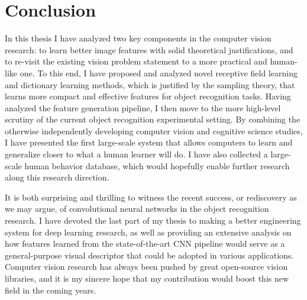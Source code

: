 \chapter{Conclusion}

In this thesis I have analyzed two key components in the computer vision research: to learn better image features with solid theoretical justifications, and to re-visit the existing vision problem statement to a more practical and human-like one. To this end, I have proposed and analyzed novel receptive field learning and dictionary learning methods, which is justified by the \nystrom sampling theory, that learns more compact and effective features for object recognition tasks. Having analyzed the feature generation pipeline, I then move to the more high-level scrutiny of the current object recognition experimental setting. By combining the otherwise independently developing computer vision and cognitive science studies, I have presented the first large-scale system that allows computers to learn and generalize closer to what a human learner will do. I have also collected a large-scale human behavior database, which would hopefully enable further research along this research direction.

It is both surprising and thrilling to witness the recent success, or rediscovery as we may argue, of convolutional neural networks in the object recognition research. I have devoted the last part of my thesis to making a better engineering system for deep learning research, as well as providing an extensive analysis on how features learned from the state-of-the-art CNN pipeline would serve as a general-purpose visual descriptor that could be adopted in various applications. Computer vision research has always been pushed by great open-source vision libraries, and it is my sincere hope that my contribution would boost this new field in the coming years.